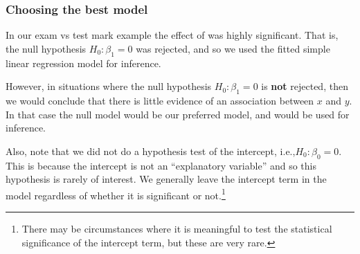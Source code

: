 \documentclass{beamer}\usepackage[]{graphicx}\usepackage[]{xcolor}
\begin{document}
\begin{frame}[fragile]
\frametitle{Choosing the best model}

In our exam vs test mark example the effect of  was highly significant. That is, the null hypothesis $H_0:\beta_1=0$ was rejected, and so we used the fitted simple linear regression model  for inference.
\bigskip

However, in situations where the null hypothesis $H_0:\beta_1=0$ is {\bf not} rejected, then we would conclude that there is little evidence of an association between $x$ and $y$. In that case the null model would be our preferred model, and would be used for inference.
\bigskip

Also, note that we did not do a hypothesis test of the intercept, i.e.,$H_0:\beta_0=0$. 
This is because the intercept is not an ``explanatory variable'' and so this hypothesis is rarely of interest. We generally leave the intercept term in the model regardless of whether it is significant or not.\footnote{There may be circumstances where it is meaningful to test the statistical significance of the intercept term, but these are very rare.}

\end{frame}



\end{document}
